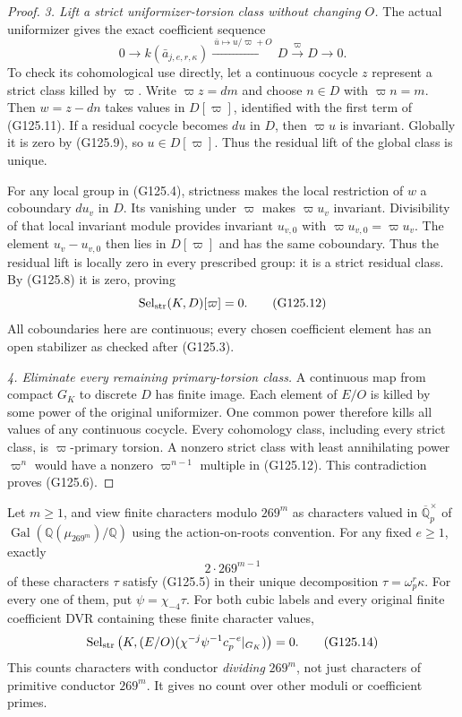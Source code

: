 \begin{proof}
\emph{3. Lift a strict uniformizer-torsion class without changing \(O\).}
The actual uniformizer gives the exact coefficient sequence
\[
 0\longrightarrow k(\bar a_{j,e,r,\kappa})
  \xrightarrow{\ \bar u\mapsto u/\varpi+O\ }D
  \xrightarrow{\varpi}D\longrightarrow0.
 \tag{G125.11}
\]
To check its cohomological use directly, let a continuous
cocycle \(z\) represent a strict class killed by \(\varpi\).
Write \(\varpi z=dm\) and choose \(n\in D\) with
\(\varpi n=m\).  Then \(w=z-dn\) takes values in
\(D[\varpi]\), identified with the first term of (G125.11).
If a residual cocycle becomes \(du\) in \(D\), then
\(\varpi u\) is invariant.  Globally it is zero by
(G125.9), so \(u\in D[\varpi]\).  Thus the residual
lift of the global class is unique.

For any local group in (G125.4), strictness makes the local
restriction of \(w\) a coboundary \(du_v\) in \(D\).
Its vanishing under \(\varpi\) makes \(\varpi u_v\)
invariant.  Divisibility of that local invariant module
provides invariant \(u_{v,0}\) with
\(\varpi u_{v,0}=\varpi u_v\).  The element
\(u_v-u_{v,0}\) then lies in \(D[\varpi]\) and has the
same coboundary.  Thus the residual lift is locally zero
in every prescribed group: it is a strict residual class.
By (G125.8) it is zero, proving
\[
                 \operatorname{Sel}_{\rm str}(K,D)[\varpi]=0.
 \tag{G125.12}
\]
All coboundaries here are continuous; every chosen coefficient
element has an open stabilizer as checked after (G125.3).

\emph{4. Eliminate every remaining primary-torsion class.}
A continuous map from compact \(G_K\) to discrete \(D\)
has finite image.  Each element of \(E/O\) is killed by
some power of the original uniformizer.  One common power
therefore kills all values of any continuous cocycle.
Every cohomology class, including every strict class, is
\(\varpi\)-primary torsion.  A nonzero strict class with
least annihilating power \(\varpi^n\) would have a
nonzero \(\varpi^{n-1}\) multiple in (G125.12).
This contradiction proves (G125.6).
\end{proof}

\begin{theorem}
\label{thm:ACG125Dirichlet}
Let \(m\ge1\), and view finite characters modulo \(269^m\)
as characters valued in \(\overline{\mathbb Q}_p^\times\) of
\(\operatorname{Gal}(\mathbb Q(\mu_{269^m})/\mathbb Q)\)
using the action-on-roots convention.  For any fixed \(e\ge1\),
exactly
\[
                              2\cdot269^{m-1}
 \tag{G125.13}
\]
of these characters \(\tau\) satisfy (G125.5) in their
unique decomposition \(\tau=\omega_p^r\kappa\).
For every one of them, put \(\psi=\chi_{-4}\tau\).
For both cubic labels and every original finite coefficient
DVR containing these finite character values,
\[
 \operatorname{Sel}_{\rm str}\left(K,
       (E/O)(\chi^{-j}\psi^{-1}c_p^{-e}|_{G_K})\right)=0.
 \tag{G125.14}
\]
This counts characters with conductor \emph{dividing}
\(269^m\), not just characters of primitive conductor
\(269^m\).  It gives no count over other moduli or coefficient primes.
\end{theorem}

